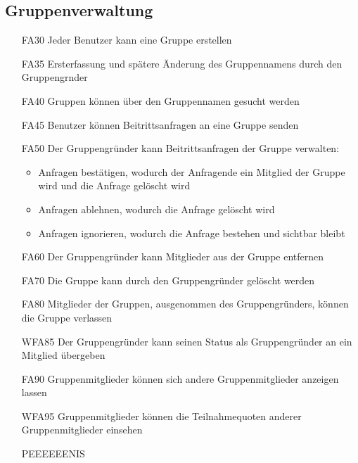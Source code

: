 \documentclass{scrartcl}
\begin{document}
	\subsection{Gruppenverwaltung}
	\begin{itemize}
	\hypertarget{FA30}{}
		\item[FA30] Jeder Benutzer kann eine Gruppe erstellen
		\hypertarget{FA35}{}
		\item[FA35] Ersterfassung und spätere Änderung des Gruppennamens durch den \gls{Gruppengrnder}
		\hypertarget{FA40}{}
		\item[FA40] Gruppen können über den Gruppennamen gesucht werden
		\hypertarget{FA45}{}
		\item[FA45] Benutzer können Beitrittsanfragen an eine Gruppe senden
		\hypertarget{FA50}{}
		\item[FA50] Der Gruppengründer kann Beitrittsanfragen der Gruppe verwalten:
		\begin{itemize}
			\item Anfragen bestätigen, wodurch der Anfragende ein \gls{Mitglied} der Gruppe wird und die Anfrage gelöscht wird
		\end{itemize}
		\begin{itemize}
			\item Anfragen ablehnen, wodurch die Anfrage gelöscht wird
		\end{itemize}
		\begin{itemize}
			\item Anfragen ignorieren, wodurch die Anfrage bestehen und sichtbar bleibt
		\end{itemize}
		\hypertarget{FA60}{}
		\item[FA60] Der Gruppengründer kann Mitglieder aus der Gruppe entfernen
		\hypertarget{FA70}{}
		\item[FA70] Die Gruppe kann durch den Gruppengründer gelöscht werden
		\hypertarget{FA80}{}
		\item[FA80] Mitglieder der Gruppen, ausgenommen des Gruppengründers, können die Gruppe verlassen
		\hypertarget{WFA85}{}
		\item[WFA85] Der Gruppengründer kann seinen Status als Gruppengründer an ein Mitglied übergeben
		\hypertarget{FA90}{}
		\item[FA90] Gruppenmitglieder können sich andere Gruppenmitglieder anzeigen lassen
		\hypertarget{WFA95}{}
		\item[WFA95] Gruppenmitglieder können die Teilnahmequoten anderer Gruppenmitglieder einsehen
		
PEEEEEENIS

	\end{itemize}
	
\end{document}
